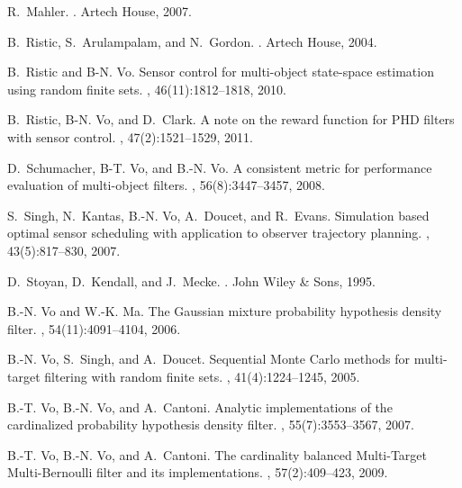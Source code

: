 \documentclass[twocolumn]{autart}
\begin{document}
\begin{thebibliography}{99}
R.~Mahler.
.
\newblock Artech House, 2007.

B.~Ristic, S.~Arulampalam, and N.~Gordon.
.
\newblock Artech House, 2004.

B.~Ristic and B-N. Vo.
\newblock Sensor control for multi-object state-space estimation using random
  finite sets.
, 46(11):1812--1818, 2010.

B.~Ristic, B-N. Vo, and D.~Clark.
\newblock A note on the reward function for {PHD} filters with sensor control.
, 47(2):1521--1529, 2011.

D.~Schumacher, B-T. Vo, and B.-N. Vo.
\newblock A consistent metric for performance evaluation of multi-object
  filters.
, 56(8):3447--3457, 2008.

S.~Singh, N.~Kantas, B.-N. Vo, A.~Doucet, and R.~Evans.
\newblock Simulation based optimal sensor scheduling with application to
  observer trajectory planning.
, 43(5):817--830, 2007.

D.~Stoyan, D.~Kendall, and J.~Mecke.
.
\newblock John Wiley \& Sons, 1995.

B.-N. Vo and W.-K. Ma.
\newblock The {G}aussian mixture probability hypothesis density filter.
, 54(11):4091--4104, 2006.

B.-N. Vo, S.~Singh, and A.~Doucet.
\newblock Sequential {Monte Carlo} methods for multi-target filtering with
  random finite sets.
, 41(4):1224--1245, 2005.

B.-T. Vo, B.-N. Vo, and A.~Cantoni.
\newblock Analytic implementations of the cardinalized probability hypothesis
  density filter.
, 55(7):3553--3567, 2007.

B.-T. Vo, B.-N. Vo, and A.~Cantoni.
\newblock The cardinality balanced {Multi-Target Multi-Bernoulli} filter and
  its implementations.
, 57(2):409--423, 2009.

\end{thebibliography}
\end{document}
